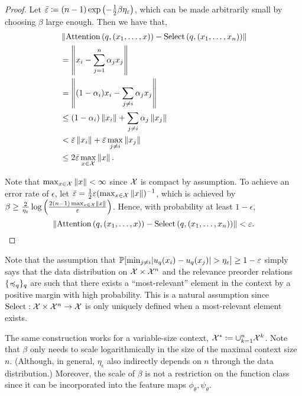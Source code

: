 \begin{proof}
    Let $\bar{\varepsilon} \coloneq (n-1) \exp\left(- \frac{1}{2} \beta \eta_{\varepsilon}\right)$, which can be made arbitrarily small by choosing $\beta$ large enough. Then we have that,
    \begin{align*}
        &\norm{\mathrm{Attention}\paren{q, (x_1, \ldots, x)} - \mathrm{Select}\paren{q, (x_1, \ldots, x_n)}} \\
        &= \norm{x_i - \sum_{j=1}^n{\alpha_j} x_j} \\
        &= \norm{(1 - \alpha_i) x_i - \sum_{j\neq i} {\alpha_j} x_j} \\
        &\leq (1 - \alpha_i)  \norm{x_i} + \sum_{j \neq i} \alpha_j \norm{x_j}\\
        &< \bar{\epsilon} \norm{x_i} + \bar{\epsilon}     \max_{j \neq i}\norm{x_j} \\
        &\leq 2 \bar{\epsilon} \max_{x \in \calX} \norm{x}.
    \end{align*}

    Note that $\max_{x \in {\mathcal{X}}} \left\lVert x\right\rVert < \infty$ since ${\mathcal{X}}$ is compact by assumption. To achieve an error rate of $\epsilon$, let $\bar{\varepsilon} = \frac{1}{2} \varepsilon (\max_{x \in {\mathcal{X}}} \left\lVert x\right\rVert)^{-1}$, which is achieved by $\beta \geq \frac{2}{\eta_\varepsilon} \log\left(\frac{2 (n-1) \max_{x \in {\mathcal{X}}} \left\lVert x\right\rVert}{\varepsilon}\right)$. Hence, with probability at least $1 - \epsilon$,
    \begin{equation*}
        \norm{\mathrm{Attention}\paren{q, (x_1, \ldots, x)} - \mathrm{Select}\paren{q, (x_1, \ldots, x_n)}} < \epsilon.
    \end{equation*}
\end{proof}

\begin{remark}
    Note that the assumption that $\mathbb{P}[\min_{j \neq i} \lvert u_q(x_i) - u_q(x_j)\rvert > \eta_\varepsilon] \geq 1 - \varepsilon$ simply says that the data distribution on ${\mathcal{X}} \times {\mathcal{X}}^n$ and the relevance preorder relations $\{\preccurlyeq_q\}_q$ are such that there exists a ``most-relevant'' element in the context by a positive margin with high probability. This is a natural assumption since $\mathrm{Select}: {\mathcal{X}} \times {\mathcal{X}}^n \to {\mathcal{X}}$ is only uniquely defined when a most-relevant element exists.
\end{remark}

\begin{remark}
    The same construction works for a variable-size context, ${\mathcal{X}}^* \coloneq \cup_{k=1}^n {\mathcal{X}}^k$. Note that $\beta$ only needs to scale logarithmically in the size of the maximal context size $n$. (Although, in general, $\eta_\epsilon$ also indirectly depends on $n$ through the data distribution.) Moreover, the scale of $\beta$ is not a restriction on the function class since it can be incorporated into the feature maps $\phi_\theta, \psi_\theta$.
\end{remark}